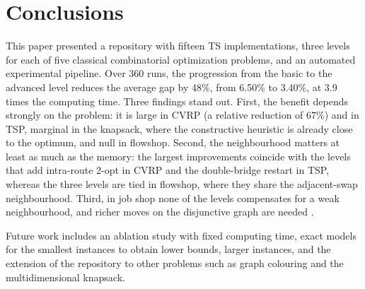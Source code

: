 \documentclass[engproc,proceedingpaper,submit,moreauthors]{Definitions/mdpi}
\begin{document}
\section{Conclusions}

This paper presented a repository with fifteen TS implementations, three levels for each of five classical combinatorial optimization problems, and an automated experimental pipeline. Over 360 runs, the progression from the basic to the advanced level reduces the average gap by 48\%, from 6.50\% to 3.40\%, at 3.9 times the computing time. Three findings stand out. First, the benefit depends strongly on the problem: it is large in CVRP (a relative reduction of 67\%) and in TSP, marginal in the knapsack, where the constructive heuristic is already close to the optimum, and null in flowshop. Second, the neighbourhood matters at least as much as the memory: the largest improvements coincide with the levels that add intra-route 2-opt in CVRP and the double-bridge restart in TSP, whereas the three levels are tied in flowshop, where they share the adjacent-swap neighbourhood. Third, in job shop none of the levels compensates for a weak neighbourhood, and richer moves on the disjunctive graph are needed \cite{nowicki1996fast,balas1998guided}.

Future work includes an ablation study with fixed computing time, exact models for the smallest instances to obtain lower bounds, larger instances, and the extension of the repository to other problems such as graph colouring and the multidimensional knapsack.

\vspace{6pt}





\end{document}
